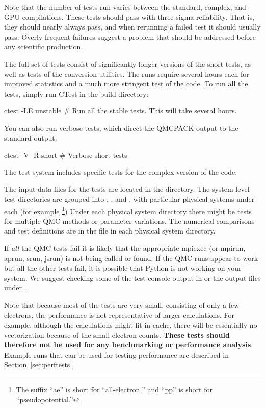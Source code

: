 Note that the number of tests run varies between the
standard, complex, and GPU compilations. These tests should pass with three sigma reliability. That is, they should nearly always pass, and when rerunning a failed test it should usually pass. Overly frequent failures suggest a problem that should be addressed before any scientific production.

The  full set of tests consist of significantly longer versions of the short
tests, as well as tests of the conversion utilities. The runs require
several hours each for improved statistics and a much more
stringent test of the code. To run all the tests, simply run CTest in the build
directory:

\begin{shade}
ctest -LE unstable           # Run all the stable tests. This will take several hours.
\end{shade}

You can also run verbose tests, which direct the QMCPACK
output to the standard output:

\begin{shade}
ctest -V -R short   # Verbose short tests
\end{shade}

The test system includes specific tests for the complex version of the code.

The input data files for the tests are located in the  directory.
The system-level test directories are grouped into , , and , with particular physical systems under each (for example 
\footnote{The suffix ``ae'' is short for ``all-electron,'' and ``pp'' is short for ``pseudopotential.''})
Under each physical system directory there might be tests for multiple QMC methods or parameter variations.
The numerical comparisons and test definitions are in the  file in each physical system directory.

If \textit{all} the QMC tests fail it is likely
that the appropriate mpiexec (or mpirun, aprun, srun, jsrun) is not being
called or found. If the QMC runs appear to work but all the other
tests fail, it is possible that Python is not working on your system. We suggest checking some of the test console output in 
or the output files under .


Note that because most of the tests are very small, consisting of only a few
electrons, the performance is not representative of larger
calculations. For example, although the calculations might fit in cache,
there will be essentially no vectorization because of the small electron
counts. \textbf{These tests should therefore not be used for any benchmarking or
performance analysis}. Example runs that can be used for testing performance are described in
Section~\ref{sec:perftests}.

